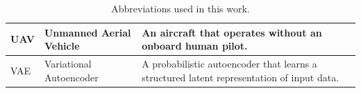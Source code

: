 \documentclass[a4paper]{article}
\begin{document}
\begin{table}[H]
\begin{tabular}{p{} p{} p{}}
UAV
& Unmanned Aerial Vehicle
& An aircraft that operates without an onboard human pilot. \\
\hline

VAE
& Variational Autoencoder
& A probabilistic autoencoder that learns a structured latent representation of input data. \\

\hline

\end{tabular}

\caption{Abbreviations used in this work.}

\label{table_abbreviations}

\end{table}


\end{document}
